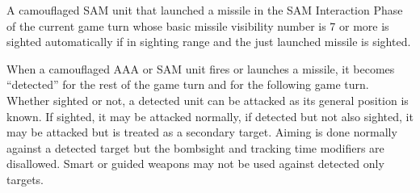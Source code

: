 A camouflaged SAM unit that launched a missile in the SAM Interaction Phase of the current game turn whose basic missile visibility number is 7 or more is sighted automatically if in sighting range and the just launched missile is sighted.

When a camouflaged AAA or SAM unit fires or launches a missile, it becomes “detected” for the rest of the game turn and for the following game turn. Whether sighted or not, a detected unit can be attacked as its general position is known. If sighted, it may be attacked normally, if detected but not also sighted, it may be attacked but is treated as a secondary target. Aiming is done normally against a detected target but the bombsight and tracking time modifiers are disallowed. Smart or guided weapons may not be used against detected only targets.

